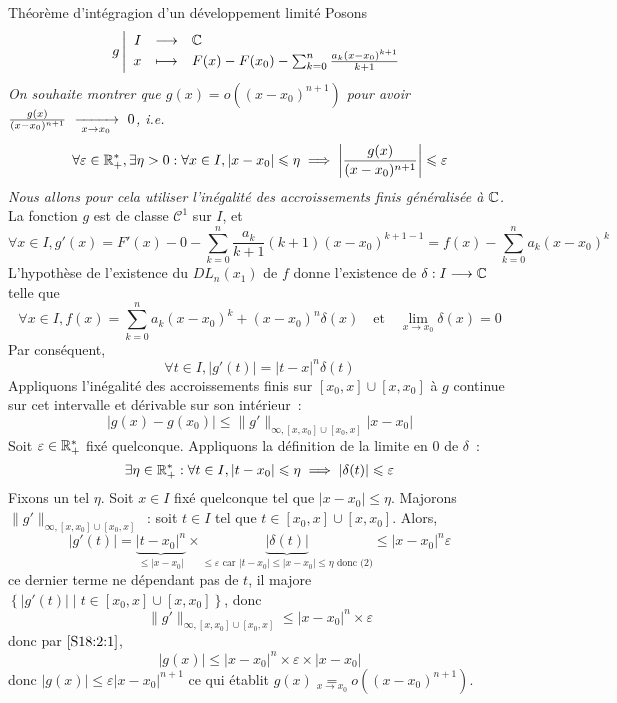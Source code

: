 \documentclass{article}
\begin{document}
\begin{question_kholle}{Théorème d’intégragion d’un développement limité}
	Posons
	\[
		g\left|\begin{array}{rcl} I & \longrightarrow & \mathbb C \\ x & \longmapsto & F(x)-F(x_{0}) - \sum_{k=0}^{n}\frac{a_{k}(x-x_{0})^{k+1}}{k+1} \end{array}\right.
	\]
	\textit{On souhaite montrer que $g(x)=o((x-x_{0})^{n+1})$ pour avoir $\frac{g(x)}{(x-x_{0})^{n+1}}\ \xrightarrow[\;x \to x_{0}\;]{}\ 0$, i.e.
	\[
		\forall \varepsilon\in\mathbb R_{+}^{*}, \exists \eta>0: \forall x\in I, |x-x_{0}|\leqslant \eta \implies  \left|\frac{g(x)}{(x-x_{0})^{n+1}}\right| \leqslant \varepsilon
	\]Nous allons pour cela utiliser l’inégalité des accroissements finis généralisée à $\mathbb C$.}
	La fonction $g$ est de classe $\mathcal C^{1}$ sur $I$, et
	\[
		\forall x\in I, g'(x)=F'(x)-0-\sum_{k=0}^{n}\frac{a_{k}}{k+1}(k+1)(x-x_{0})^{k+1-1} = f(x)-\sum_{k=0}^{n}a_{k}(x-x_{0})^{k}
	\]
	L’hypothèse de l’existence du $DL_{n}(x_{1})$ de $f$ donne l’existence de $\delta:I\longrightarrow \mathbb C$ telle que
	\[
		\forall x\in I, f(x)=\sum_{k=0}^{n}a_{k}(x-x_{0})^{k}+(x-x_{0})^{n}\delta(x) \quad\text{et}\quad \lim_{x\to x_{0}}\delta(x)=0
	\]
	Par conséquent,
	\[
		\forall t\in I, |g'(t)| = |t-x|^{n}\delta(t)
	\]
	Appliquons l’inégalité des accroissements finis sur $[x_{0}, x]\cup [x, x_{0}]$ à $g$ continue sur cet intervalle et dérivable sur son intérieur~:
	\begin{equation}\label{S18:2:1}
		|g(x)-g(x_{0})| \leq \|g'\|_{\infty, [x, x_{0}]\cup[x_{0}, x]}|x-x_{0}|
	\end{equation}
	Soit $\varepsilon\in\mathbb R_{+}^{*}$ fixé quelconque. Appliquons la définition de la limite en $0$ de $\delta$~:
	\begin{equation*}\label{S18:2:2}
		\exists \eta\in\mathbb R_{+}^{*}: \forall t\in I, |t-x_{0}|\leqslant \eta \implies  |\delta(t)| \leqslant \varepsilon
	\end{equation*}
	Fixons un tel $\eta$. Soit $x\in I$ fixé quelconque tel que $|x-x_{0}|\leq \eta$. Majorons $\|g'\|_{\infty, [x, x_{0}]\cup[x_{0}, x]}$~: soit $t\in I$ tel que $t\in [x_{0}, x]\cup[x, x_{0}]$. Alors,
	\[
		|g'(t)| = \underbrace{|t-x_{0}|^{n}}_{\leq |x-x_{0}|} \times \underbrace{|\delta(t)|}_{\leq \varepsilon \text{ car $|t-x_{0}|\leq|x-x_{0}|\leq \eta$ donc (2)}} \leq |x-x_{0}|^{n} \varepsilon
	\]
	ce dernier terme ne dépendant pas de $t$, il majore $\left\{|g'(t)| \mid t\in[x_{0}, x]\cup [x, x_{0}]\right\}$, donc
	\[
		\|g'\|_{\infty, [x, x_{0}]\cup[x_{0}, x]}\leq |x-x_{0}|^{n}\times \varepsilon
	\]
	donc par $\eqref{S18:2:1}$,
	\[
		|g(x)| \leq |x-x_{0}|^{n} \times \varepsilon \times |x-x_{0}|
	\]
	donc $|g(x)|\leq \varepsilon|x-x_{0}|^{n+1}$ ce qui établit $g(x)\underset{x\to x_{0}}{=}o((x-x_{0})^{n+1})$.
\end{question_kholle}
\end{document}
